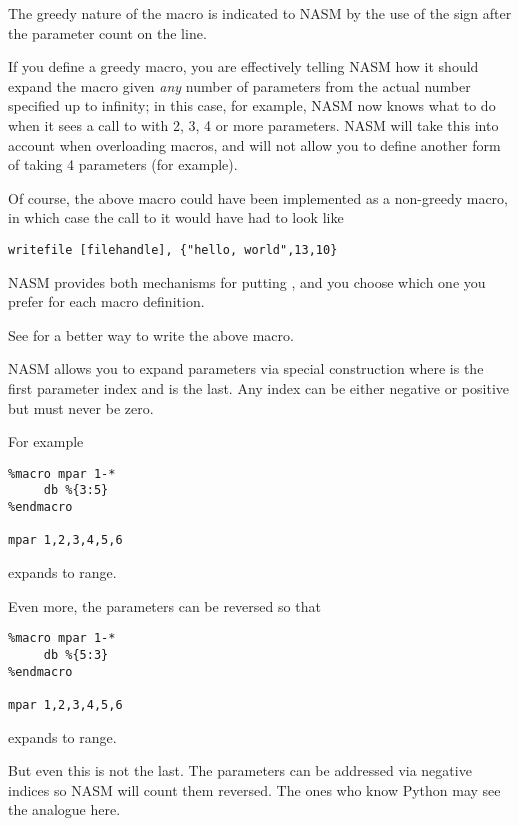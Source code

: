 The greedy nature of the macro is indicated to NASM by the use of
the \code{+} sign after the parameter count on the
 line.

If you define a greedy macro, you are effectively telling NASM how
it should expand the macro given \emph{any} number of parameters from
the actual number specified up to infinity; in this case, for
example, NASM now knows what to do when it sees a call to
 with 2, 3, 4 or more parameters. NASM will take this
into account when overloading macros, and will not allow you to
define another form of  taking 4 parameters (for
example).

Of course, the above macro could have been implemented as a
non-greedy macro, in which case the call to it would have had to
look like

\begin{lstlisting}
writefile [filehandle], {"hello, world",13,10}
\end{lstlisting}

NASM provides both mechanisms for putting , and you choose which one you prefer for each macro
definition.

See  for a better way to write the above macro.


NASM allows you to expand parameters via special construction 
where  is the first parameter index and  is the last.
Any index can be either negative or positive but must never be zero.

For example

\begin{lstlisting}
%macro mpar 1-*
     db %{3:5}
%endmacro

mpar 1,2,3,4,5,6
\end{lstlisting}

expands to  range.

Even more, the parameters can be reversed so that

\begin{lstlisting}
%macro mpar 1-*
     db %{5:3}
%endmacro

mpar 1,2,3,4,5,6
\end{lstlisting}

expands to  range.

But even this is not the last. The parameters can be addressed via negative
indices so NASM will count them reversed. The ones who know Python may see
the analogue here.

